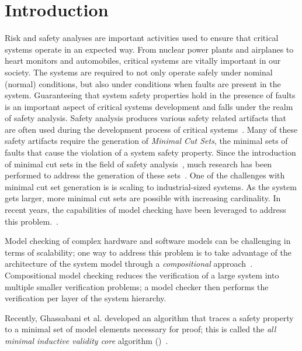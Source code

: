 \section{Introduction}
\label{sec:intro}

Risk and safety analyses are important activities used to ensure that critical systems operate in an expected way. From nuclear power plants and airplanes to heart monitors and automobiles, critical systems are vitally important in our society. The systems are required to not only operate safely under nominal (normal) conditions, but also under conditions when faults are present in the system. Guaranteeing that system safety properties hold in the presence of faults is an important aspect of critical systems development and falls under the realm of safety analysis. Safety analysis produces various safety related artifacts that are often used during the development process of critical systems~\cite{SAE:ARP4761,SAE:ARP4754A}. Many of these safety artifacts require the generation of \textit{Minimal Cut Sets}, the minimal sets of faults that cause the violation of a system safety property. Since the introduction of minimal cut sets in the field of safety analysis~\cite{vesely1981fault}, much research has been performed to address the generation of these sets~\cite{fta:survey,rauzy1993new,historyFTA,Bozzano:2010:DSA:1951720,rausand2003system}. One of the challenges with minimal cut set generation is is scaling to industrial-sized systems. As the system gets larger, more minimal cut sets are possible with increasing cardinality. In recent years, the capabilities of model checking have been leveraged to address this problem.~\cite{bieber2002combination,schafer2003combining,fta:survey,contractBasedDesign,symbFTA,DBLP:conf/cav/BozzanoCPJKPRT15}. 

Model checking of complex hardware and software models can be challenging in terms of scalability; one way to address this problem is to take advantage of the architecture of the system model through a \textit{compositional} approach~\cite{anderson1996model, clarke1989compositional,mcmillan1999verification}. Compositional model checking reduces the verification of a large system into multiple smaller verification problems; a model checker then performs the verification per layer of the system hierarchy. 

Recently, Ghassabani et al. developed an algorithm that traces a safety property to a minimal set of model elements necessary for proof; this is called the \textit{all minimal inductive validity core} algorithm (\aivcalg)~\cite{GhassabaniGW16,Ghassabani2017EfficientGO,bendik2018online}. 

